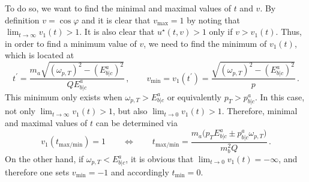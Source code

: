 To do so, we want to find the minimal and maximal values of $t$ and $v$. By definition ${v=\cos\varphi}$ and it is clear that ${v_{\text{max}}=1}$ by noting that ${\lim_{t\to\infty}v_1(t)>1}$. It is also clear that ${u^\star(t,v)>1}$ only if ${v>v_1(t)}$. Thus, in order to find a minimum value of $v$, we need to find the minimum of $v_1(t)$, which is located at
\begin{equation}
    t^\prime=\frac{m_a\sqrt{(\omega_{p,T})^2-(E^a_{b\vert c})^2}}{QE^a_{b\vert c}}\,,\qquad v_{\text{min}}=v_1(t^\prime)=\frac{\sqrt{(\omega_{p,T})^2-(E^a_{b\vert c})^2}}{p}\,.
    \label{eq:Cubature_vmin}
\end{equation}
This minimum only exists when ${\omega_{p,T}>E^a_{b\vert c}}$ or equivalently ${p_T>p^a_{b\vert c}}$. In this case, not only ${\lim_{t\to\infty}v_1(t)>1}$, but also ${\lim_{t\to0}v_1(t)>1}$. Therefore, minimal and maximal values of $t$ can be determined via
\begin{equation}
    v_1(t_{\text{max/min}})=1\qquad\iff\qquad t_{\text{max/min}}=\frac{m_a\big(p_TE^a_{b\vert c}\pm p^a_{b\vert c}\omega_{p,T}\big)}{m_b^2Q}\,.
    \label{eq:Cubature_tminmax}
\end{equation}
On the other hand, if ${\omega_{p,T}<E^a_{b\vert c}}$, it is obvious that ${\lim_{t\to0}v_1(t)=-\infty}$, and therefore one sets ${v_{\text{min}}=-1}$ and accordingly ${t_{\text{min}}=0}$.

